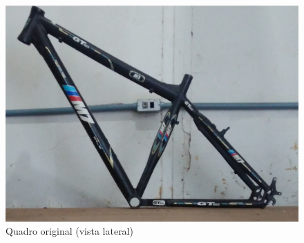	\graphicspath{{figuras/}}
	\begin{figure}[h!]
		\centering
		\includegraphics[scale=0.20]{quadro_original_lateral.jpg}
		\caption{Quadro original (vista lateral)}
		\label{img:quadro_original_lateral}
	\end{figure}

